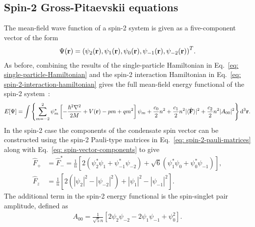 \subsection{Spin-2 Gross-Pitaevskii equations}
The mean-field wave function of a spin-2 system is given as a five-component
vector of the form
\begin{align}
    \Psi(\vb{r}) = {(\psi_2(\vb{r}), \psi_1(\vb{r}), \psi_0(\vb{r}),
    \psi_{-1}(\vb{r}), \psi_{-2}(\vb{r}))}^T.
\end{align}
As before, combining the results of the single-particle Hamiltonian in
Eq.~\eqref{eq: single-particle-Hamiltonian} and the spin-2 interaction
Hamiltonian in Eq.~\eqref{eq: spin-2-interaction-hamiltonian} gives the
full mean-field energy functional of the spin-2 system~\cite{Kawaguchi2012}:
\begin{equation}\label{eq: spin-2-energy-functional}
    E[\Psi] = \int \left\{\sum_{m=-2}^{2}\psi_m^*
    \left[-\frac{\hbar^2\nabla^2}{2M} + V(\vb{r}) -pm + qm^2\right]\psi_m
    + \frac{c_0}{2}n^2 + \frac{c_1}{2}n^2|\langle \hat{\vb{F}} \rangle |^2
    + \frac{c_2}{2}n^2|A_{00}|^2\right\} \dd^3\vb{r}.
\end{equation}
In the spin-2 case the components of the condensate spin vector can be
constructed using the spin-2 Pauli-type matrices in
Eq.~\eqref{eq: spin-2-pauli-matrices} along with
Eq.~\eqref{eq: spin-vector-components} to give
\begin{align}
    \hat{F}_+ &= \hat{F}_-^* = \frac{1}{n}\left[2\left(\psi^*_2\psi_1
    + \psi_{-1}^*\psi_{-2}\right) + \sqrt{6}\left(\psi_1^*\psi_0
    + \psi_0^*\psi_{-1}\right)\right], \\
    \hat{F}_z &= \frac{1}{n}\left[2\left(|\psi_2|^2-|\psi_{-2}|^2\right)
    + |\psi_1|^2 - |\psi_{-1}|^2\right].
\end{align}
The additional term in the spin-2 energy functional is the spin-singlet pair
amplitude, defined as
\begin{align}
    A_{00} = \frac{1}{\sqrt{5}n}\left[2\psi_2\psi_{-2} - 2\psi_1\psi_{-1}
        + \psi_0^2\right].
\end{align}

